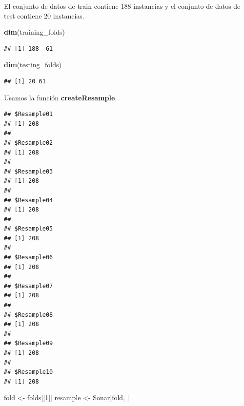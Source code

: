 \documentclass[
]{article}
\newenvironment{Shaded}{\begin{snugshade}}{\end{snugshade}}
\newcommand{\DataTypeTok}[1]{\textcolor[rgb]{0.13,0.29,0.53}{#1}}
\newcommand{\DecValTok}[1]{\textcolor[rgb]{0.00,0.00,0.81}{#1}}
\newcommand{\KeywordTok}[1]{\textcolor[rgb]{0.13,0.29,0.53}{\textbf{#1}}}
\newcommand{\NormalTok}[1]{#1}
\newcommand{\OperatorTok}[1]{\textcolor[rgb]{0.81,0.36,0.00}{\textbf{#1}}}
\newcommand{\OtherTok}[1]{\textcolor[rgb]{0.56,0.35,0.01}{#1}}
\newcommand{\StringTok}[1]{\textcolor[rgb]{0.31,0.60,0.02}{#1}}
\begin{document}
El conjunto de datos de train contiene 188 instancias y el conjunto de
datos de test contiene 20 instancias.

\begin{Shaded}
\begin{Highlighting}[]
\KeywordTok{dim}\NormalTok{(training_folds)}
\end{Highlighting}
\end{Shaded}

\begin{verbatim}
## [1] 188  61
\end{verbatim}

\begin{Shaded}
\begin{Highlighting}[]
\KeywordTok{dim}\NormalTok{(testing_folds)}
\end{Highlighting}
\end{Shaded}

\begin{verbatim}
## [1] 20 61
\end{verbatim}

Usamos la función \textbf{createResample}.

\begin{Shaded}
\end{Shaded}

\begin{verbatim}
## $Resample01
## [1] 208
## 
## $Resample02
## [1] 208
## 
## $Resample03
## [1] 208
## 
## $Resample04
## [1] 208
## 
## $Resample05
## [1] 208
## 
## $Resample06
## [1] 208
## 
## $Resample07
## [1] 208
## 
## $Resample08
## [1] 208
## 
## $Resample09
## [1] 208
## 
## $Resample10
## [1] 208
\end{verbatim}

\begin{Shaded}
\begin{Highlighting}[]
\NormalTok{fold <-}\StringTok{ }\NormalTok{folds[[}\DecValTok{1}\NormalTok{]]}
\NormalTok{resample <-}\StringTok{ }\NormalTok{Sonar[fold, ]}
\end{Highlighting}
\end{Shaded}
\end{document}
